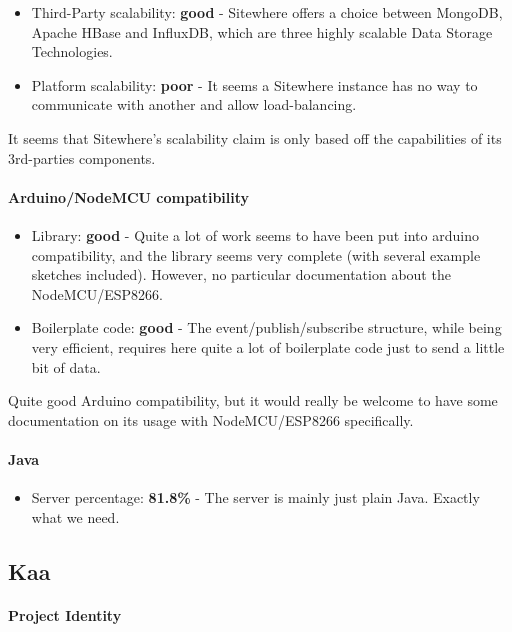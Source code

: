 \documentclass{article}
\begin{document}
\begin{itemize}
\item Third-Party scalability: \textbf{good} - Sitewhere offers a choice between MongoDB, Apache HBase and InfluxDB, which are three highly scalable Data Storage Technologies.
\item Platform scalability: \textbf{poor} - It seems a Sitewhere instance has no way to communicate with another and allow load-balancing.
\end{itemize}

It seems that Sitewhere's scalability claim is only based off the capabilities of its 3rd-parties components.

\paragraph{Arduino/NodeMCU compatibility}

\begin{itemize}
\item Library: \textbf{good} - Quite a lot of work seems to have been put into arduino compatibility, and the library seems very complete (with several example sketches included). However, no particular documentation about the NodeMCU/ESP8266.
\item Boilerplate code: \textbf{good} - The event/publish/subscribe structure, while being very efficient, requires here quite a lot of boilerplate code just to send a little bit of data.
\end{itemize}

Quite good Arduino compatibility, but it would really be welcome to have some documentation on its usage with NodeMCU/ESP8266 specifically.

\paragraph{Java}

\begin{itemize}
\item Server percentage: \textbf{81.8\%} - The server is mainly just plain Java. Exactly what we need.
\end{itemize}

\subsection{Kaa}

\paragraph{Project Identity}
\end{document}
